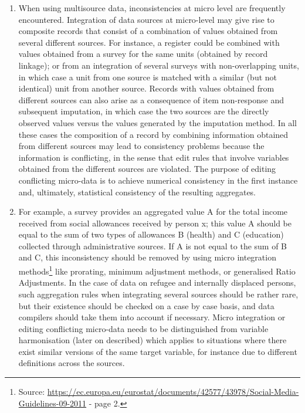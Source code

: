 \documentclass[
]{article}
\begin{document}
\begin{enumerate}
\def\labelenumi{\arabic{enumi}.}
\setcounter{enumi}{219}
\item
  When using multisource data, inconsistencies at micro level are
  frequently encountered. Integration of data sources at micro-level
  may give rise to composite records that consist of a combination of
  values obtained from several different sources. For instance, a
  register could be combined with values obtained from a survey for
  the same units (obtained by record linkage); or from an integration
  of several surveys with non-overlapping units, in which case a unit
  from one source is matched with a similar (but not identical) unit
  from another source. Records with values obtained from different
  sources can also arise as a consequence of item non-response and
  subsequent imputation, in which case the two sources are the
  directly observed values versus the values generated by the
  imputation method. In all these cases the composition of a record by
  combining information obtained from different sources may lead to
  consistency problems because the information is conflicting, in the
  sense that edit rules that involve variables obtained from the
  different sources are violated. The purpose of editing conflicting
  micro-data is to achieve numerical consistency in the first instance
  and, ultimately, statistical consistency of the resulting
  aggregates.
\item
  For example, a survey provides an aggregated value A for the total
  income received from social allowances received by person x; this
  value A should be equal to the sum of two types of allowances B
  (health) and C (education) collected through administrative sources.
  If A is not equal to the sum of B and C, this inconsistency should
  be removed by using micro integration methods\footnote{Source:
    \url{https://ec.europa.eu/eurostat/documents/42577/43978/Social-Media-Guidelines-09-2011}
    - page 2.} like prorating,
  minimum adjustment methods, or generalised Ratio Adjustments. In the
  case of data on refugee and internally displaced persons, such
  aggregation rules when integrating several sources should be rather
  rare, but their existence should be checked on a case by case basis,
  and data compilers should take them into account if necessary. Micro
  integration or editing conflicting micro-data needs to be
  distinguished from variable harmonisation (later on described) which
  applies to situations where there exist similar versions of the same
  target variable, for instance due to different definitions across
  the sources.
\end{enumerate}
\end{document}
